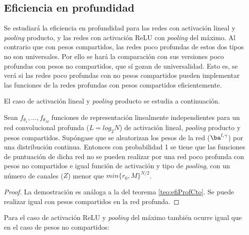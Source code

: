 \subsection{Eficiencia en profundidad}

Se estudiará la eficiencia en profundidad para las redes con activación lineal y \textit{pooling} producto, y las redes con activación ReLU con \textit{pooling} del máximo. Al contrario que con pesos compartidos, las redes poco profundas de estos dos tipos no son universales. Por ello se hará la comparación con sus versiones poco profundas con pesos no compartidos, que sí gozan de universalidad. Esto es, se verá si las redes poco profundas con no pesos compartidos pueden implementar las funciones de la redes profundas con pesos  compartidos eficientemente.

El caso de activación lineal y \textit{pooling} producto se estudia a continuación.

\begin{teorema} \label{teo:efiProf3}
Sean $f_{\theta_1},... ,f_{\theta_M}$ funciones de representación linealmente independientes para un red convolucional profunda ($L = log_2 N$) de activación lineal, \textit{pooling} producto y pesos compartidos. Supóngase que se aleatorizan los pesos de la red ($\ba^{l,\gamma}$) por una distribución continua. Entonces con probabilidad 1 se tiene que las funciones de puntuación de dicha red no se pueden realizar por una red poco profunda con pesos no compartidos e igual función de activación y tipo de \textit{pooling}, con un número de canales ($Z$) menor que $min\{r_0,M\}^{N/2}$.
\end{teorema}
\begin{proof}
La demostración es análoga a la del teorema \ref{teo:efiProfCto}. Se puede realizar igual con pesos compartidos en la red profunda.
\end{proof}

Para el caso de activación ReLU y \textit{pooling} del máximo también ocurre igual que en el caso de pesos no compartidos:

